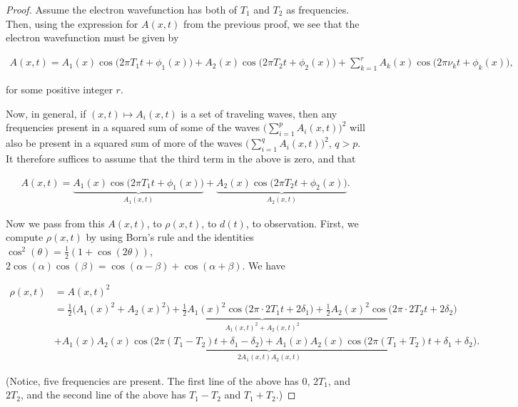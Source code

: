 \documentclass{article}
\begin{document}
\begin{proof}
	Assume the electron wavefunction has both of $T_1$ and $T_2$ as frequencies. Then, using the expression for $A(x, t)$ from the previous proof, we see that the electron wavefunction must be given by
	
	\begin{align*}
		A(x, t) = A_1(x) \cos\Big(2\pi T_1 t + \phi_1(x)\Big) +
		A_2(x) \cos\Big(2\pi T_2 t + \phi_2(x)\Big) +		
		\sum_{k = 1}^r A_k(x) \cos\Big(2\pi \nu_k t + \phi_k(x)\Big),
	\end{align*}
	
	for some positive integer $r$.
	
	Now, in general, if $(x, t) \mapsto A_i(x, t)$ is a set of traveling waves, then any frequencies present in a squared sum of some of the waves $\Big( \sum_{i = 1}^p A_i(x, t) \Big)^2$ will also be present in a squared sum of more of the waves $\Big( \sum_{i = 1}^q A_i(x, t) \Big)^2$, $q > p$. It therefore suffices to assume that the third term in the above is zero, and that
	
	\begin{align*}
		A(x, t) = \underbrace{A_1(x) \cos\Big(2\pi T_1 t + \phi_1(x)\Big)}_{A_1(x, t)} +
		\underbrace{A_2(x) \cos\Big(2\pi T_2 t + \phi_2(x)\Big)}_{A_2(x, t)}.
	\end{align*}
	
	Now we pass from this $A(x, t)$, to $\rho(x, t)$, to $d(t)$, to observation. First, we compute $\rho(x, t)$ by using Born's rule and the identities $\cos^2(\theta) = \frac{1}{2}(1 + \cos(2\theta))$, $2\cos(\alpha)\cos(\beta) = \cos(\alpha - \beta)+\cos(\alpha + \beta)$. We have
	
	\begin{align*}
		\rho(x, t) &= A(x, t)^2 \\
		&= \underbrace{\frac{1}{2}\Big(A_1(x)^2 + A_2(x)^2\Big) + \frac{1}{2}A_1(x)^2 \cos\big(2\pi \cdot 2T_1 t + 2\delta_1\big) + \frac{1}{2}A_2(x)^2 \cos\big(2\pi \cdot 2T_2 t + 2\delta_2\big)}_{A_1(x, t)^2 + A_2(x, t)^2} \\
		&+ \underbrace{A_1(x) A_2(x) \cos\big(2\pi(T_1 - T_2)t + \delta_1 - \delta_2\big) + A_1(x) A_2(x) \cos\big(2\pi(T_1 + T_2)t + \delta_1 + \delta_2\big)}_{2 A_1(x, t) A_2(x, t)}.
	\end{align*}
	
	(Notice, five frequencies are present. The first line of the above has $0$, $2T_1$, and $2T_2$, and the second line of the above has $T_1 - T_2$ and $T_1 + T_2$.)
	

\end{proof}
\end{document}
